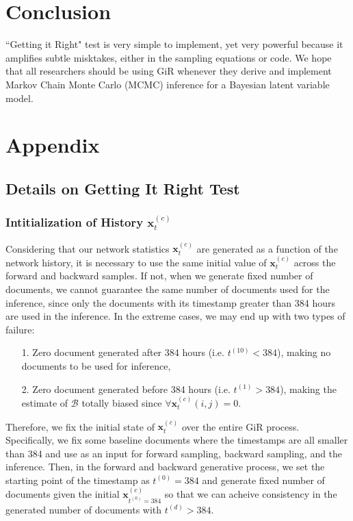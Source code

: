 \documentclass[a4paper]{article}
\begin{document}
\section{Conclusion} 
``Getting it Right" test is very simple to implement, yet very powerful because it amplifies subtle
misktakes, either in the sampling equations or code. We hope that all researchers should be using GiR whenever they derive and implement Markov Chain Monte Carlo (MCMC) inference for a Bayesian latent variable model.
 \clearpage


\appendix
 \section*{Appendix}
 \renewcommand{\thesubsection}{\Alph{subsection}}
         \subsection{Details on Getting It Right Test}\label{subsec:Details on GiR}

        \subsubsection{Intitialization of History $\boldsymbol{x}_t^{(c)}$} \label{subsubsec: Initial history issue}
        Considering that our network statistics $\boldsymbol{x}_t^{(c)}$ are generated as a function of the network history, it is necessary to use the same initial value of $\boldsymbol{x}_t^{(c)}$ across the forward and backward samples. If not, when we generate fixed number of documents, we cannot guarantee the same number of documents used for the inference, since only the documents with its timestamp greater than 384 hours are used in the inference. In the extreme cases, we may end up with two types of failure:
        \begin{itemize}
        	\item[1.] Zero document generated after 384 hours (i.e. $t^{(10)} < 384$), making no documents to be used for inference,
        	\item[2.] Zero document generated before 384 hours (i.e. $t^{(1)} > 384$), making the estimate of $\mathcal{B}$ totally biased since $\forall  \boldsymbol{x}_t^{(c)}(i, j) = 0$. 
        \end{itemize}
        Therefore, we fix the initial state of $\boldsymbol{x}_t^{(c)}$ over the entire GiR process. Specifically, we fix some baseline documents where the timestamps are all smaller than 384 and use as an input for forward sampling, backward sampling, and the inference. Then, in the forward and backward generative process, we set the starting point of the timestamp as $t^{(0)} = 384$ and generate fixed number of documents given the initial $\boldsymbol{x}_{t^{(0)} = 384}^{(c)}$ so that we can acheive consistency in the generated number of documents with $t^{(d)} > 384$.
\end{document}
